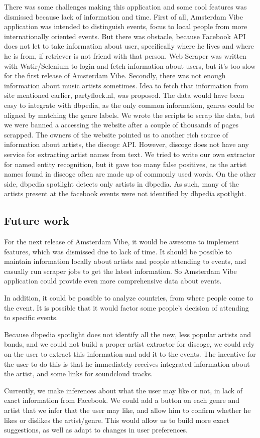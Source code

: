 \documentclass[12pt, a4paper, lithuanian]{article}
\begin{document}
  There was some challenges making this application and some cool features was dismissed because lack of information and time. First of all, Amsterdam Vibe application was intended to distinguish events, focus to local people from more internationally oriented events. But there was obstacle, because Facebook API does not let to take information about user, specifically where he lives and where he is from, if retriever is not friend with that person. Web Scraper was written with Watir/Selenium to login and fetch information about users, but it's too slow for the first release of Amsterdam Vibe.
  Secondly, there was not enough information about music artists sometimes. Idea to fetch that information from site mentioned earlier, partyflock.nl, was proposed. The data would have been easy to integrate with dbpedia, as the only common information, genres could be aligned by matching the genre labels. We wrote the scripts to scrap the data, but we were banned a accessing the website after a couple of thousands of pages scrapped. The owners of the website pointed us to another rich source of information about artists, the discogc API. However, discogc does not have any service for extracting artist names from text. We tried to write our own extractor for named entity recognition, but it gave too many false positives, as the artist names found in discogc often are made up of commonly used words. 
 On the other side, dbpedia spotlight detects only artists in dbpedia. As such, many of the artists present at the facebook events were not identified by dbpedia spotlight.

\subsection{Future work}

  For the next release of Amsterdam Vibe, it would be awesome to implement features, which was dismissed due to lack of time. It should be possible to maintain information locally about artists and people attending to events, and casually run scraper jobs to get the latest information. So Amsterdam Vibe application could provide even more comprehensive data about events.

  In addition, it could be possible to analyze countries, from where people come to the event. It is possible that it would factor some people's decision of attending to specific events.

  Because dbpedia spotlight does not identify all the new, less popular artists and bands, and we could not build a proper artist extractor for discogc, we could rely on the user to extract this information and add it to the events. The incentive for the user to do this is that he immediately receives integrated information about the artist, and some links for soundcloud tracks. 

  Currently, we make inferences about what the user may like or not, in lack of exact information from Facebook. We could add a button on each genre and artist that we infer that the user may like, and allow him to confirm whether he likes or dislikes the artist/genre. This would allow us to build more exact suggestions, as well as adapt to changes in user preferences.
\end{document}
